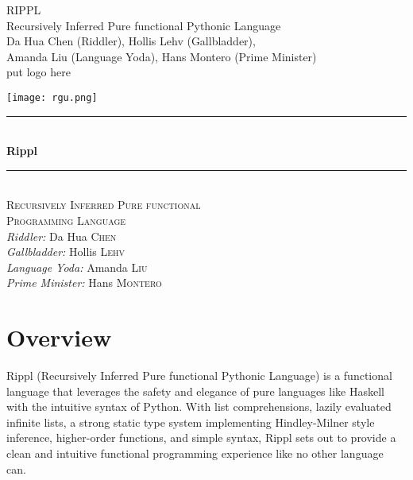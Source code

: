 \documentclass[5pt]{article}
\begin{document}
\begin{titlepage}\centering
\vspace*{\fill}
\Huge RIPPL \\
\LARGE Recursively Inferred Pure functional Pythonic Language \\
\vspace*{\fill}
\large Da Hua Chen (Riddler), Hollis Lehv (Gallbladder),\\Amanda Liu (Language Yoda), Hans Montero (Prime Minister) \\
put logo here
\end{titlepage}

\begin{titlepage}
\newcommand{\HRule}{\rule{\linewidth}{0.5mm}} %
\begin{center} 
 
\texttt{[image: rgu.png]}\\[1cm] 

\HRule \\[0.4cm]
{ \Huge \bfseries Rippl}\\[0.2cm]
\HRule \\[0.8cm]

 \textsc{\LARGE  Recursively Inferred Pure functional \\ Programming Language}\\[1.5cm]

\large \emph{Riddler:}
Da Hua \textsc{Chen}\\
\large \emph{Gallbladder:}
Hollis \textsc{Lehv}\\
\large \emph{Language Yoda:}
Amanda \textsc{Liu}\\ 
\large \emph{Prime Minister:}
Hans \textsc{Montero}\\
\vfill %
\end{center} 
\end{titlepage}


\pagebreak
\tableofcontents
\pagebreak
\section{Overview}
Rippl (Recursively Inferred Pure functional Pythonic Language) is a functional language that leverages the safety and elegance of pure languages like Haskell with the intuitive syntax of Python. With list comprehensions, lazily evaluated infinite lists, a strong static type system implementing Hindley-Milner style inference, higher-order functions, and simple syntax, Rippl sets out to provide a clean and intuitive functional programming experience like no other language can.
\end{document}
